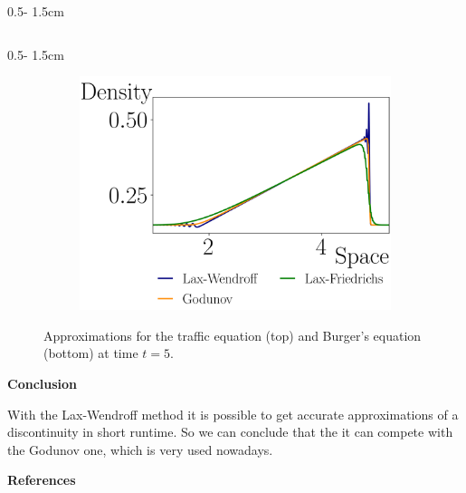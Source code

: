 \documentclass{uibposter}
\begin{document}
\begin{frame}[fragile]
\begin{columns}
\begin{column}{0.5\textwidth - 1.5cm}
\begin{column}{0.5\textwidth - 1.5cm}
\begin{figure}
	\begin{subfigure}{\textwidth}
		\includegraphics{fig/burger_compare.png}
	\end{subfigure}
	\caption{Approximations for the traffic equation (top) and Burger's equation (bottom) at time $t = 5$.}
	\label{img:non_lin_equation}
\end{figure}

\textbf{Conclusion}

\vspace{0.5cm}
With the Lax-Wendroff method it is possible to get accurate approximations of a discontinuity in short runtime. So we can conclude that the it can compete with the Godunov one, which is very used nowadays.

    \vspace{0.5cm}
    \textbf{\scriptsize{References}}
    \vspace{0.3cm}
    \nocite{*} 
    
    
    

\end{column}
\end{column}
\end{columns}





\end{frame}
\end{document}
